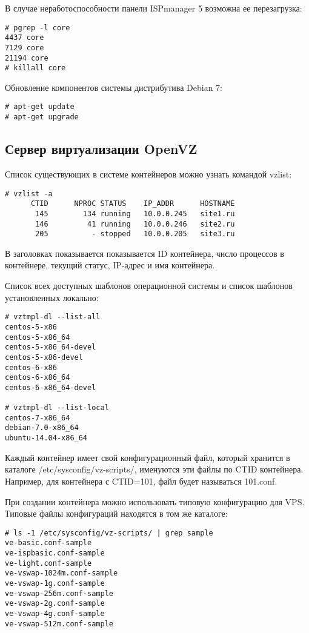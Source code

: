 В случае неработоспособности панели ISPmanager 5 возможна ее перезагрузка:
\begin{lstlisting}
# pgrep -l core
4437 core
7129 core
21194 core
# killall core
\end{lstlisting}

Обновление компонентов системы дистрибутива Debian 7:
\begin{lstlisting}
# apt-get update
# apt-get upgrade
\end{lstlisting}

\subsection{Сервер виртуализации OpenVZ}

Список существующих в системе контейнеров можно узнать командой vzlist:
\begin{lstlisting}
# vzlist -a
      CTID      NPROC STATUS    IP_ADDR      HOSTNAME
       145        134 running   10.0.0.245   site1.ru
       146         41 running   10.0.0.246   site2.ru
       205          - stopped   10.0.0.205   site3.ru
\end{lstlisting}

В заголовках показывается показывается ID контейнера, число процессов в контейнере, текущий статус, IP-адрес и имя контейнера.

Список всех доступных шаблонов операционной системы и список шаблонов установленных локально:
\begin{lstlisting}
# vztmpl-dl --list-all
centos-5-x86
centos-5-x86_64
centos-5-x86_64-devel
centos-5-x86-devel
centos-6-x86
centos-6-x86_64
centos-6-x86_64-devel

# vztmpl-dl --list-local
centos-7-x86_64
debian-7.0-x86_64
ubuntu-14.04-x86_64
\end{lstlisting}

Каждый контейнер имеет свой конфигурационный файл, который хранится в каталоге /etc/sysconfig/vz-scripts/, именуются эти файлы по CTID контейнера.
Например, для контейнера с CTID=101, файл будет называться 101.conf.

При создании контейнера можно использовать типовую конфигурацию для VPS.
Типовые файлы конфигураций находятся в том же каталоге:
\begin{lstlisting}
# ls -1 /etc/sysconfig/vz-scripts/ | grep sample
ve-basic.conf-sample
ve-ispbasic.conf-sample
ve-light.conf-sample
ve-vswap-1024m.conf-sample
ve-vswap-1g.conf-sample
ve-vswap-256m.conf-sample
ve-vswap-2g.conf-sample
ve-vswap-4g.conf-sample
ve-vswap-512m.conf-sample
\end{lstlisting}

